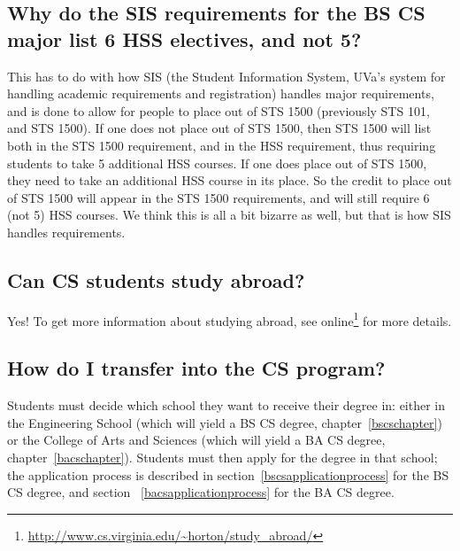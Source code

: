 \documentclass[10pt,letter]{book}
\newcommand{\myurl}[1]{\footnote{\scriptsize\url{#1}}}
\begin{document}
\subsection{Why do the SIS requirements for the BS CS major list 6 HSS
  electives, and not 5?}
\label{sec:sishssissue}

This has to do with how SIS (the Student Information System, UVa's
system for handling academic requirements and registration) handles
major requirements, and is done to allow for people to place out of
STS 1500 (previously STS 101, and STS 1500). If one does not
place out of STS 1500, then STS 1500 will list both in the STS 1500
requirement, and in the HSS requirement, thus requiring students to
take 5 additional HSS courses. If one does place out of STS 1500, they
need to take an additional HSS course in its place. So the credit to
place out of STS 1500 will appear in the STS 1500 requirements, and
will still require 6 (not 5) HSS courses. We think this is all a bit
bizarre as well, but that is how SIS handles requirements.


\subsection{Can CS students study abroad?}

Yes! To get more information about studying abroad, see
online\myurl{http://www.cs.virginia.edu/~horton/study_abroad/}
for more details.
 
\subsection{How do I transfer into the CS program?}

Students must decide which school they want to receive their degree
in: either in the Engineering School (which will yield a BS CS degree,
chapter~\ref{bscschapter}) or the College of Arts and Sciences (which
will yield a BA CS degree, chapter~\ref{bacschapter}).  Students must
then apply for the degree in that school; the application process is
described in section~\ref{bscsapplicationprocess} for the BS CS
degree, and section ~\ref{bacsapplicationprocess} for the BA CS degree.
\end{document}

